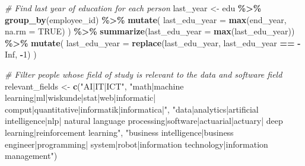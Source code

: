 \documentclass[11pt,]{article}
\newenvironment{Shaded}{\begin{snugshade}}{\end{snugshade}}
\newcommand{\AttributeTok}[1]{\textcolor[rgb]{0.13,0.29,0.53}{#1}}
\newcommand{\CommentTok}[1]{\textcolor[rgb]{0.56,0.35,0.01}{\textit{#1}}}
\newcommand{\ConstantTok}[1]{\textcolor[rgb]{0.56,0.35,0.01}{#1}}
\newcommand{\DecValTok}[1]{\textcolor[rgb]{0.00,0.00,0.81}{#1}}
\newcommand{\FunctionTok}[1]{\textcolor[rgb]{0.13,0.29,0.53}{\textbf{#1}}}
\newcommand{\NormalTok}[1]{#1}
\newcommand{\OtherTok}[1]{\textcolor[rgb]{0.56,0.35,0.01}{#1}}
\newcommand{\SpecialCharTok}[1]{\textcolor[rgb]{0.81,0.36,0.00}{\textbf{#1}}}
\newcommand{\StringTok}[1]{\textcolor[rgb]{0.31,0.60,0.02}{#1}}
\begin{document}
\begin{Shaded}
\begin{Highlighting}[]
\CommentTok{\# Find last year of education for each person}
\NormalTok{last\_year }\OtherTok{\textless{}{-}}\NormalTok{ edu }\SpecialCharTok{\%\textgreater{}\%}
  \FunctionTok{group\_by}\NormalTok{(employee\_id) }\SpecialCharTok{\%\textgreater{}\%}
  \FunctionTok{mutate}\NormalTok{(}
    \AttributeTok{last\_edu\_year =} \FunctionTok{max}\NormalTok{(end\_year, }\AttributeTok{na.rm =} \ConstantTok{TRUE}\NormalTok{)}
\NormalTok{  ) }\SpecialCharTok{\%\textgreater{}\%}
  \FunctionTok{summarize}\NormalTok{(}\AttributeTok{last\_edu\_year =} \FunctionTok{max}\NormalTok{(last\_edu\_year)) }\SpecialCharTok{\%\textgreater{}\%} 
  \FunctionTok{mutate}\NormalTok{(}
    \AttributeTok{last\_edu\_year =} \FunctionTok{replace}\NormalTok{(last\_edu\_year, last\_edu\_year }\SpecialCharTok{==} \SpecialCharTok{{-}}\ConstantTok{Inf}\NormalTok{, }\SpecialCharTok{{-}}\DecValTok{1}\NormalTok{)}
\NormalTok{  )}

\CommentTok{\# Filter people whose field of study is relevant to the data and software field}
\NormalTok{relevant\_fields }\OtherTok{\textless{}{-}} \FunctionTok{c}\NormalTok{(}\StringTok{"AI|IT|ICT"}\NormalTok{,}
                     \StringTok{"math|machine learning|ml|wiskunde|stat|web|informatic|}
\StringTok{                       comput|quantitative|informatik|informatica|"}\NormalTok{,}
                     \StringTok{"data|analytics|artificial intelligence|nlp|}
\StringTok{                        natural language processing|software|actuarial|actuary|}
\StringTok{                       deep learning|reinforcement learning"}\NormalTok{,}
                     \StringTok{"business intelligence|business engineer|programming|}
\StringTok{                       system|robot|information technology|information management"}\NormalTok{)}


\end{Highlighting}
\end{Shaded}
\end{document}
